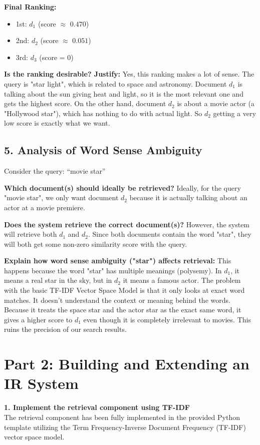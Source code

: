 \documentclass{svproc}
\begin{document}
\textbf{Final Ranking:}
\begin{itemize}
    \item 1st: $d_1$ (score $\approx$ $0.470$)
    \item 2nd: $d_2$ (score $\approx$ $0.051$)
    \item 3rd: $d_3$ (score = $0$)
\end{itemize}

\textbf{Is the ranking desirable? Justify:}
Yes, this ranking makes a lot of sense. The query is "star light", which is related to space and astronomy. Document $d_1$ is talking about the sun giving heat and light, so it is the most relevant one and gets the highest score. On the other hand, document $d_2$ is about a movie actor (a "Hollywood star"), which has nothing to do with actual light. So $d_2$ getting a very low score is exactly what we want.

\subsection*{5. Analysis of Word Sense Ambiguity}
Consider the query: ``movie star''

\textbf{Which document(s) should ideally be retrieved?}
Ideally, for the query "movie star", we only want document $d_2$ because it is actually talking about an actor at a movie premiere.

\textbf{Does the system retrieve the correct document(s)?}
However, the system will retrieve both $d_1$ and $d_2$. Since both documents contain the word "star", they will both get some non-zero similarity score with the query.

\textbf{Explain how word sense ambiguity ("star") affects retrieval:}
This happens because the word "star" has multiple meanings (polysemy). In $d_1$, it means a real star in the sky, but in $d_2$ it means a famous actor. The problem with the basic TF-IDF Vector Space Model is that it only looks at exact word matches. It doesn't understand the context or meaning behind the words. Because it treats the space star and the actor star as the exact same word, it gives a higher score to $d_1$ even though it is completely irrelevant to movies. This ruins the precision of our search results.

\section*{Part 2: Building and Extending an IR System}
\textbf{1. Implement the retrieval component using TF-IDF} \\
The retrieval component has been fully implemented in the provided Python template utilizing the Term Frequency-Inverse Document Frequency (TF-IDF) vector space model. 
\end{document}

